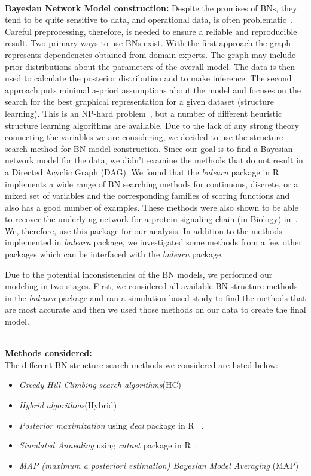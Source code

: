 \documentclass[smallcondensed]{svjour3}     %
\begin{document}
\noindent\\
\textbf{Bayesian Network Model construction:}
Despite the promises of BNs, they tend to be quite sensitive to data,
and operational data, is often problematic~\cite{M14,zmz15}. 
Careful preprocessing, therefore, is needed to ensure a 
reliable and reproducible result. Two primary ways to use BNs exist. With the first
approach the graph represents dependencies obtained from domain experts.
The graph may include prior distributions
about the parameters of the overall model. The data is then used to
calculate the posterior distribution and to make inference. The
second approach puts minimal a-priori assumptions about the model
and focuses on the search for the best graphical representation for a given dataset
(structure learning). This is an NP-hard problem~\cite{chickering1996learning},
but a number of different heuristic structure learning algorithms are
available. Due to the lack of any strong theory connecting the variables we are considering,
we decided to use the structure search method for BN model construction.
Since our goal is to find a Bayesian network model for the data, we didn't
examine the methods that do not result in a Directed Acyclic Graph
(DAG). We found that the \textit{bnlearn} package in R implements a wide range of BN searching
methods for continuous, discrete, or a mixed set of variables and
the corresponding families of scoring functions and also has a good number of examples.
These methods were also shown to be able to recover the underlying network for a 
protein-signaling-chain (in Biology) in~\cite{bnppt}. We, therefore,
use this package for our analysis. In addition to the methods
implemented in \textit{bnlearn} package, we investigated some 
methods from a few other packages which can be interfaced with
the \textit{bnlearn} package.

Due to the potential inconsistencies of the BN models, we performed our 
modeling in two stages. First, we considered all available BN structure 
methods in the \textit{bnlearn} package and ran a simulation based study to 
find the methods that are most accurate and then we used those methods on our 
data to create the final model.

\noindent\\
\textbf{Methods considered:}\\
The different BN structure search methods we considered are listed below:

\begin{itemize}
\item \textit{Greedy Hill-Climbing search algorithms}(HC)~\cite{nagarajan2013bayesian,bnppt}
\item \textit{Hybrid algorithms}(Hybrid)~\cite{nagarajan2013bayesian,bnppt}
\item \textit{Posterior maximization} using \textit{deal} package in R~\cite{bnppt,dealR} .
\item \textit{Simulated Annealing} using \textit{catnet} package in R~\cite{catnetR,bnppt}.
\item \textit{MAP (maximum a posteriori estimation) Bayesian Model Averaging} (MAP) ~\cite{nagarajan2013bayesian,bnppt}
\end{itemize}
\end{document}
